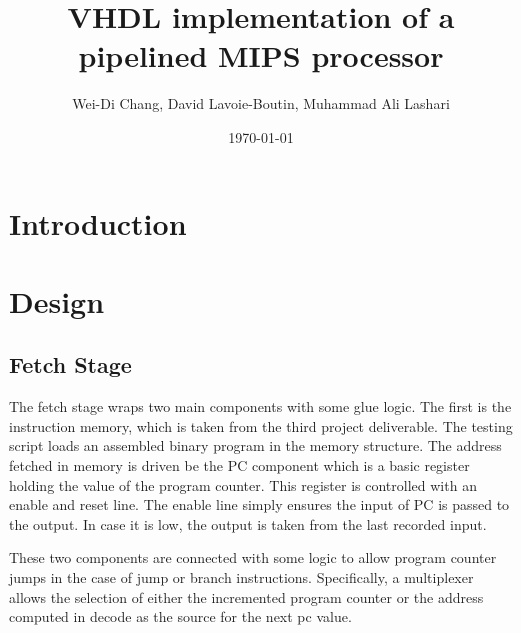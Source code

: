 \documentclass[12pt]{IEEEtran} %
\title{VHDL implementation of a pipelined MIPS processor}
\date{\today}
\author{Wei-Di Chang, David Lavoie-Boutin, Muhammad Ali Lashari}
\begin{document}

\section{Introduction} %
\label{sec:introduction}

\section{Design} %
\label{sec:design}

\subsection{Fetch Stage} %
\label{sub:fetch_stage}
The fetch stage wraps two main components with some glue logic. The first is the instruction memory, which is taken from the third project deliverable. The testing script loads an assembled binary program in the memory structure. The address fetched in memory is driven be the PC component which is a basic register holding the value of the program counter. This register is controlled with an enable and reset line. The enable line simply ensures the input of PC is passed to the output. In case it is low, the output is taken from the last recorded input.

These two components are connected with some logic to allow program counter jumps in the case of jump or branch instructions. Specifically, a multiplexer allows the selection of either the incremented program counter or the address computed in decode as the source for the next pc value.  
\end{document}
